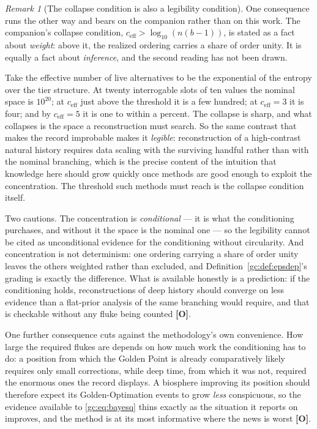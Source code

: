 \documentclass[11pt]{article}
\numberwithin{equation}{section}
\theoremstyle{plain}
\theoremstyle{definition}
\theoremstyle{remark}
\newtheorem{remark}[theorem]{Remark}
\begin{document}
\begin{remark}[The collapse condition is also a legibility condition]
\label{gc:rem:legibility}
One consequence runs the other way and bears on the companion rather than
on this work. The companion's collapse condition,
$c_{\mathrm{eff}}>\log_{10}(n(b-1))$, is stated as a fact about
\emph{weight}: above it, the realized ordering carries a share of order
unity. It is equally a fact about \emph{inference}, and the second
reading has not been drawn.

Take the effective number of live alternatives to be the exponential of
the entropy over the tier structure. At twenty interrogable slots of ten
values the nominal space is $10^{20}$; at $c_{\mathrm{eff}}$ just above
the threshold it is a few hundred; at $c_{\mathrm{eff}}=3$ it is four;
and by $c_{\mathrm{eff}}=5$ it is one to within a percent. The collapse
is sharp, and what collapses is the space a reconstruction must search.
So the same contrast that makes the record improbable makes it
\emph{legible}: reconstruction of a high-contrast natural history
requires data scaling with the surviving handful rather than with the
nominal branching, which is the precise content of the intuition that
knowledge here should grow quickly once methods are good enough to
exploit the concentration. The threshold such methods must reach is the
collapse condition itself.

Two cautions. The concentration is \emph{conditional} --- it is what the
conditioning purchases, and without it the space is the nominal one ---
so the legibility cannot be cited as unconditional evidence for the
conditioning without circularity. And concentration is not determinism:
one ordering carrying a share of order unity leaves the others weighted
rather than excluded, and Definition~\ref{gc:def:epsdep}'s grading is exactly the
difference. What is available honestly is a prediction: if the
conditioning holds, reconstructions of deep history should converge on
less evidence than a flat-prior analysis of the same branching would
require, and that is checkable without any fluke being counted
\textbf{[O]}.
\end{remark}

One further consequence cuts against the methodology's own convenience.
How large the required flukes are depends on how much work the
conditioning has to do: a position from which the Golden Point is already comparatively
likely requires only small corrections, while deep time, from which it
was not, required the enormous ones the record displays. A biosphere
improving its position should therefore expect its Golden-Optimation
events to grow \emph{less} conspicuous, so the evidence available to
\eqref{gc:eq:bayesq} thins exactly as the situation it reports on
improves, and the method is at its most informative where the news is
worst \textbf{[O]}.
\end{document}
